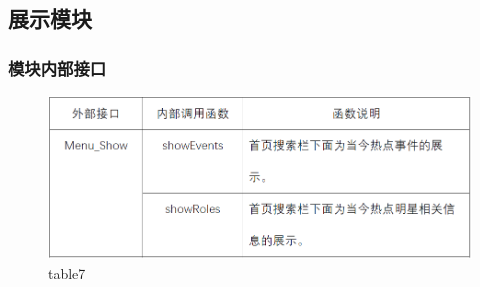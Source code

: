 \subsection{展示模块}
\subsubsection{模块内部接口}
\begin{figure}[!htb]
	\centering
	\includegraphics[scale=1]{image/b7.png} %
	\caption{table7} %
\end{figure}
